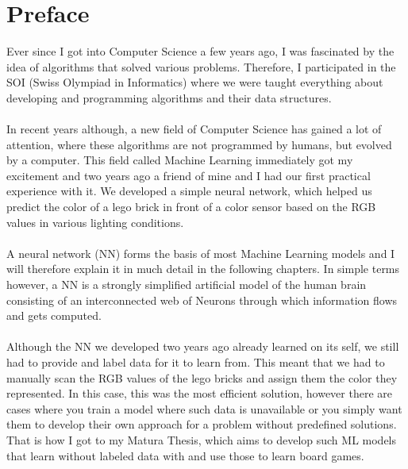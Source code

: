 \documentclass[11pt]{report}
\begin{document}
    \section{Preface}\label{sec:preface}
    Ever since I got into Computer Science a few years ago, I was fascinated by the idea of algorithms that solved various problems.
    Therefore, I participated in the SOI (Swiss Olympiad in Informatics) where we were taught everything about developing and programming algorithms and their data structures.
    \\ \\
    In recent years although, a new field of Computer Science has gained a lot of attention, where these algorithms are not programmed by humans, but evolved by a computer.
    This field called Machine Learning immediately got my excitement and two years ago a friend of mine and I had our first practical experience with it.
    We developed a simple neural network, which helped us predict the color of a lego brick in front of a color sensor based on the RGB values in various lighting conditions.
    \\ \\
    A neural network (NN) forms the basis of most Machine Learning models and I will therefore explain it in much detail in the following chapters.
    In simple terms however, a NN is a strongly simplified artificial model of the human brain consisting of an interconnected web of Neurons through which information flows and gets computed.
    \\ \\
    Although the NN we developed two years ago already learned on its self, we still had to provide and label data for it to learn from.
    This meant that we had to manually scan the RGB values of the lego bricks and assign them the color they represented.
    In this case, this was the most efficient solution, however there are cases where you train a model where such data is unavailable or you simply want them to develop their own approach for a problem without predefined solutions.
    That is how I got to my Matura Thesis, which aims to develop such ML models that learn without labeled data with and use those to learn board games.
\end{document}
